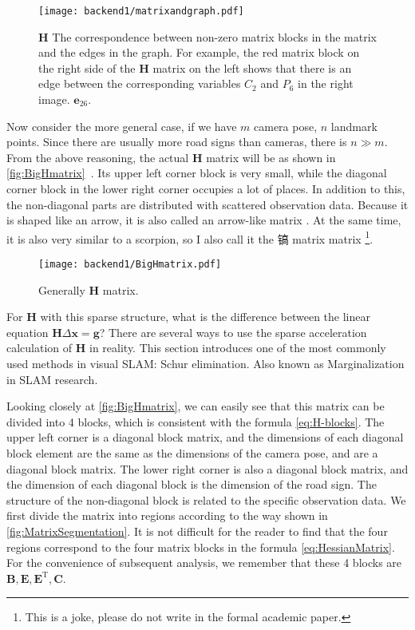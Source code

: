 \begin{figure}[!htp]
\centering
\texttt{[image: backend1/matrixandgraph.pdf]}
\caption{$\bm{H}$ The correspondence between non-zero matrix blocks in the matrix and the edges in the graph. For example, the red matrix block on the right side of the $\bm{H}$ matrix on the left shows that there is an edge between the corresponding variables $C_2$ and $P_6$ in the right image. $\bm{e}_{26} $. }
\label{fig:matrixandgraph}
\end{figure}

Now consider the more general case, if we have $m$ camera pose, $n$ landmark points. Since there are usually more road signs than cameras, there is $n \gg m$. From the above reasoning, the actual $\bm{H}$ matrix will be as shown in \autoref{fig:BigHmatrix}~. Its upper left corner block is very small, while the diagonal corner block in the lower right corner occupies a lot of places. In addition to this, the non-diagonal parts are distributed with scattered observation data. Because it is shaped like an arrow, it is also called an arrow-like matrix \textsuperscript{\cite{Barfoot2016}}. At the same time, it is also very similar to a scorpion, so I also call it the 镐 matrix matrix \footnote{ This is a joke, please do not write in the formal academic paper. }.

\begin{figure}[!ht]
\centering
\texttt{[image: backend1/BigHmatrix.pdf]}
\caption{Generally $\bm{H}$ matrix. }
\label{fig:BigHmatrix}
\end{figure}

For $\bm{H}$ with this sparse structure, what is the difference between the linear equation $\bm{H} \Delta \bm{x}= \bm{g}$? There are several ways to use the sparse acceleration calculation of $\bm{H}$ in reality. This section introduces one of the most commonly used methods in visual SLAM: Schur elimination. Also known as Marginalization in SLAM research.

Looking closely at \autoref{fig:BigHmatrix}, we can easily see that this matrix can be divided into 4 blocks, which is consistent with the formula \eqref{eq:H-blocks}. The upper left corner is a diagonal block matrix, and the dimensions of each diagonal block element are the same as the dimensions of the camera pose, and are a diagonal block matrix. The lower right corner is also a diagonal block matrix, and the dimension of each diagonal block is the dimension of the road sign. The structure of the non-diagonal block is related to the specific observation data. We first divide the matrix into regions according to the way shown in \autoref{fig:MatrixSegmentation}. It is not difficult for the reader to find that the four regions correspond to the four matrix blocks in the formula \eqref{eq:HessianMatrix}. For the convenience of subsequent analysis, we remember that these 4 blocks are $\bm{B}, \bm{E}, \bm{E}^\mathrm{T}, \bm{C}$.

